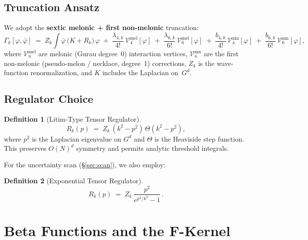 \documentclass[11pt,a4paper]{article}
\theoremstyle{definition}
\newtheorem{definition}{Definition}[section]
\theoremstyle{plain}
\theoremstyle{remark}
\newcommand{\Rk}{R_k}
\newcommand{\Gk}{\Gamma_k}
\begin{document}
\subsection{Truncation Ansatz}

We adopt the \textbf{sextic melonic + first non-melonic} truncation:
\begin{equation}
  \Gk[\varphi,\bar\varphi]
  \;=\;
  Z_k\!\int\! \bar\varphi\,\bigl(K + \Rk\bigr)\,\varphi
  \;+\;
  \frac{\lambda_{4,k}}{4!}\,\mathcal{V}_4^{\text{mel}}[\varphi]
  \;+\;
  \frac{\lambda_{6,k}}{6!}\,\mathcal{V}_6^{\text{mel}}[\varphi]
  \;+\;
  \frac{b_{4,k}}{4!}\,\mathcal{V}_4^{\text{nm}}[\varphi]
  \;+\;
  \frac{b_{6,k}}{6!}\,\mathcal{V}_6^{\text{nm}}[\varphi],
  \label{eq:truncation}
\end{equation}
where $\mathcal{V}_n^{\text{mel}}$ are melonic (Gurau degree~0)
interaction vertices, $\mathcal{V}_n^{\text{nm}}$ are the first
non-melonic (pseudo-melon / necklace, degree~1) corrections, $Z_k$ is
the wave-function renormalization, and $K$ includes the Laplacian on~$G^d$.

\subsection{Regulator Choice}

\begin{definition}[Litim-Type Tensor Regulator]
\label{def:litim}
\begin{equation}
  \Rk(p)\;=\;Z_k\,(k^2 - p^2)\,\Theta(k^2-p^2),
  \label{eq:litim_reg}
\end{equation}
where $p^2$ is the Laplacian eigenvalue on $G^d$ and $\Theta$ is the
Heaviside step function.  This preserves $O(N)^d$ symmetry and permits
analytic threshold integrals.
\end{definition}

For the uncertainty scan (\S\ref{sec:scan}), we also employ:

\begin{definition}[Exponential Tensor Regulator]
\label{def:exp_reg}
\begin{equation}
  \Rk(p)\;=\;Z_k\,\frac{p^2}{e^{p^2/k^2}-1}\,.
  \label{eq:exp_reg}
\end{equation}
\end{definition}


\section{Beta Functions and the F-Kernel}
\label{sec:beta}
\end{document}
